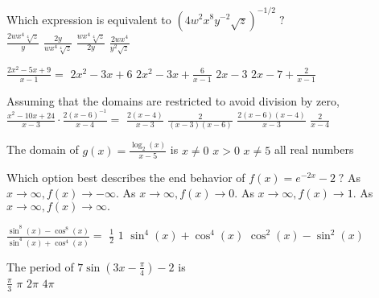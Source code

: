 \begin{question}
Which expression is equivalent to \(\left(4w^2 x^8 y^{-2} \sqrt z \right)^{-1/2} \; ?\) \\
\choicesline
{\(\frac{2w x^4 \sqrt[4]{z}}{y}\)}
{}
{\(\frac{2y}{wx^4 \sqrt[4] z}\)}
{\(\frac{wx^4 \sqrt[4] z}{2y}\)}
{\(\frac{2wx^4}{y^2 \sqrt z}\)}
\end{question}

\begin{question}
\(\frac{2x^2 - 5x + 9}{x - 1} = \)
\choices
{\(2x^2 - 3x + 6\)}
{}
{\(2x^2 - 3x + \frac{6}{x - 1}\)}
{\(2x - 3\)}
{\(2x - 7 + \frac{2}{x - 1}\)}
\end{question}

\begin{question}
Assuming that the domains are restricted to avoid division by zero,    \(\frac{x^2 - 10x + 24}{x - 3} \cdot \frac{2(x - 6)^{-1}}{x - 4} = \)
\choices
{\(\frac{2(x - 4)}{x - 3}\)}
{}
{\(\frac{2}{(x - 3)(x - 6)}\)}
{\(\frac{2(x - 6)(x - 4)}{x - 3}\)}
{\(\frac{2}{x - 4}\)}
\end{question}

\begin{question}
The domain of \(g(x) = \frac{\log_2(x)}{x - 5}\) is 
\choices
{\(x \ne 0\)}
{\(x > 0\)}
{\(x \ne 5\)}
{}
{all real numbers}
\end{question}

\begin{question}
Which option best describes the end behavior of \(f(x) = e^{-2x} - 2 \; ?\)
\choices
{As \(x \to \infty, f(x) \to -\infty.\)}
{}
{As \(x \to \infty, f(x) \to 0.\)}
{As \(x \to \infty, f(x) \to 1.\)}
{As \(x \to \infty, f(x) \to \infty.\)}
\end{question}

\begin{question}
\(\frac{\sin^8(x) - \cos^8(x)}{\sin^4(x) + \cos^4(x)} =\)
\choices
{\(\frac{1}{2}\)}
{\(1\)}
{}
{\(\sin^4(x) + \cos^4(x)\)}
{\(\cos^2(x) - \sin^2(x)\)}
\end{question}

\begin{question}
The period of \(7 \sin \left(3x - \frac{\pi}{4}\right) - 2\) is \\
\choicesline
{\(\frac{\pi}{3}\)}
{}
{\(\pi\)}
{\(2 \pi\)}
{\(4 \pi \)}
\end{question}

